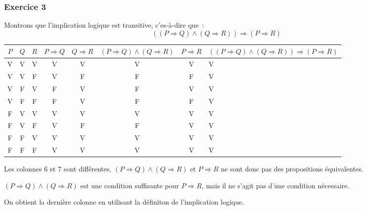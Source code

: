 \documentclass[10pt,notheorems]{beamer}
\theoremstyle{plain}
\theoremstyle{definition} %
\begin{document}
\begin{frame}
  \frametitle{Exercice 3}
  \fontsize{8}{10}\selectfont
    
  Montrons que l'implication logique est transitive, c'es-à-dire que~:
    \[
      ((P \Rightarrow Q) \land (Q \Rightarrow R)) \Rightarrow (P \Rightarrow R)
    \]
    \fontsize{4}{5}\selectfont
    \begin{table}[H]
    \begin{tabular}[H]{|ccc|ccccg|}
      \hline
      $P$ & $Q$ & $R$ & $P\Rightarrow Q$ & $Q\Rightarrow R$ & $(P\Rightarrow Q) \land (Q\Rightarrow R)$ & $P\Rightarrow R$ & $((P\Rightarrow Q) \land (Q\Rightarrow R))\Rightarrow (P\Rightarrow R)$\\ \hline
      V & V & V & V & V & V & V & V \\
      V & V & F & V & F & F & F & V \\
      V & F & V & F & V & F & V & V \\
      V & F & F & F & V & F & F & V \\
      F & V & V & V & V & V & V & V \\
      F & V & F & V & F & F & V & V \\
      F & F & V & V & V & V & V & V \\
      F & F & F & V & V & V & V & V \\
      \hline\hline
    \end{tabular}
  \end{table}
  \fontsize{8}{10}\selectfont
  \bigskip
  {\tiny \textdbend} Les colonnes 6 et 7 sont différentes, $(P \Rightarrow Q) \land (Q \Rightarrow R)$ et $P \Rightarrow R$ ne sont donc pas des propositions équivalentes.\newline
  
  $(P \Rightarrow Q) \land (Q \Rightarrow R)$ est une condition suffisante pour $P \Rightarrow R$, mais il ne s'agit pas d'une condition nécessaire.\newline

  On obtient la dernière colonne en utilisant la définiton de l'implication logique.
  
\end{frame}
\end{document}
